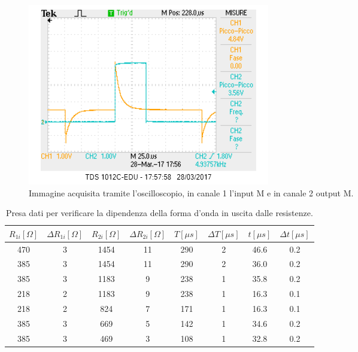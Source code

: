 \documentclass[10pt,a4paper]{article}
\begin{document}
\begin{figure}[!htb]
  \centering
  \includegraphics[scale=0.75]{generatore1inm2outm.png}
\caption{Immagine acquisita tramite l'oscilloscopio, in canale 1 l'input M e in canale 2 output M.\label{osc:generatorequadra}}
\end{figure}


\begin{table}[!htb]
\centering
\begin{tabular}{|c|c|c|c|c|c|c|c|}
\hline 
$R_{1i} [\Omega]$ & $\Delta R_{1i} [\Omega]$ & $R_{2i} [\Omega]$  & $\Delta R_{2i} [\Omega]$ & $T [\mu s]$ & $\Delta T [\mu s]$&$t [\mu s ]$ & $\Delta t [\mu s]$\\
\hline
 470 & 3 & 1454	& 11 & 290 & 2& 46.6& 0.2\\ 
\hline
385 & 3 & 1454	& 11 & 290 & 2& 36.0& 0.2\\ 
\hline 
 385 & 3 & 1183	& 9 & 238 & 1& 35.8& 0.2\\
\hline
218 & 2 & 1183	& 9 & 238 & 1& 16.3& 0.1\\ 
\hline
218 & 2 & 824	& 7 & 171 & 1& 16.3& 0.1\\ 
\hline
385 & 3 & 669	& 5 & 142 & 1& 34.6& 0.2\\ 
\hline
 385 & 3 & 469	& 3 & 108 & 1& 32.8& 0.2\\ 
 \hline
\end{tabular} 
\caption{Presa dati per verificare la dipendenza della forma d'onda in uscita dalle resistenze.\label{tab:generatore}}
\end{table}
\end{document}
